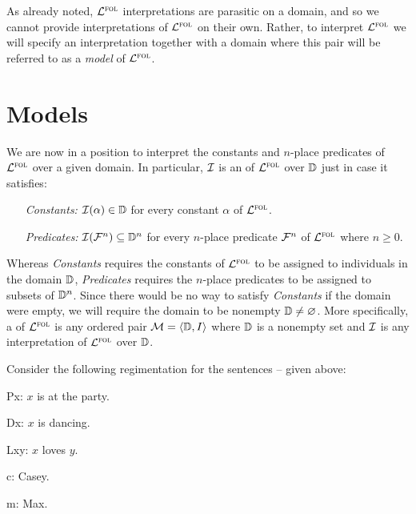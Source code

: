 As already noted, $\mathcal{L}^{\textsc{fol}}$ interpretations are parasitic on a domain, and so we cannot provide interpretations of $\mathcal{L}^{\textsc{fol}}$ on their own.
Rather, to interpret $\mathcal{L}^{\textsc{fol}}$ we will specify an interpretation together with a domain where this pair will be referred to as a \textit{model} of $\mathcal{L}^{\textsc{fol}}$.


\section{Models}
\label{ch9.FOL-Models}

We are now in a position to interpret the constants and $n$-place predicates of $\mathcal{L}^{\textsc{fol}}$ over a given domain.
In particular, $\mathcal{I}$ is an  of $\mathcal{L}^{\textsc{fol}}$ over $\mathbb{D}$ just in case it satisfies:

\begin{enumerate}[leftmargin=1.5in]
  \item[\it Constants:] $\mathcal{I}(\alpha)\in\mathbb{D}$ for every constant $\alpha$ of $\mathcal{L}^{\textsc{fol}}$. 
  \item[\it Predicates:] $\mathcal{I}(\mathcal{F}^n)\subseteq\mathbb{D}^n$ for every $n$-place predicate $\mathcal{F}^n$ of $\mathcal{L}^{\textsc{fol}}$ where $n\geq 0$.
\end{enumerate}

Whereas \textit{Constants} requires the constants of $\mathcal{L}^{\textsc{fol}}$ to be assigned to individuals in the domain $\mathbb{D}$, \textit{Predicates} requires the $n$-place predicates to be assigned to subsets of $\mathbb{D}^n$.
Since there would be no way to satisfy \textit{Constants} if the domain were empty, we will require the domain to be nonempty $\mathbb{D}\neq\varnothing$.
More specifically, a  of $\mathcal{L}^{\textsc{fol}}$ is any ordered pair $\mathcal{M}=\langle\mathbb{D},I\rangle$ where $\mathbb{D}$ is a nonempty set and $\mathcal{I}$ is any interpretation of $\mathcal{L}^{\textsc{fol}}$ over $\mathbb{D}$.

Consider the following regimentation for the sentences  --  given above:

\begin{multicols}{2}

\begin{earg} \label{regsimp}
\end{earg}

\vfill
\strut

\begin{ekey}
  \item[Px:] $x$ is at the party.
  \item[Dx:] $x$ is dancing. 
  \item[Lxy:] $x$ loves $y$.
  \item[c:] Casey.
  \item[m:] Max.
\end{ekey}

\end{multicols}

